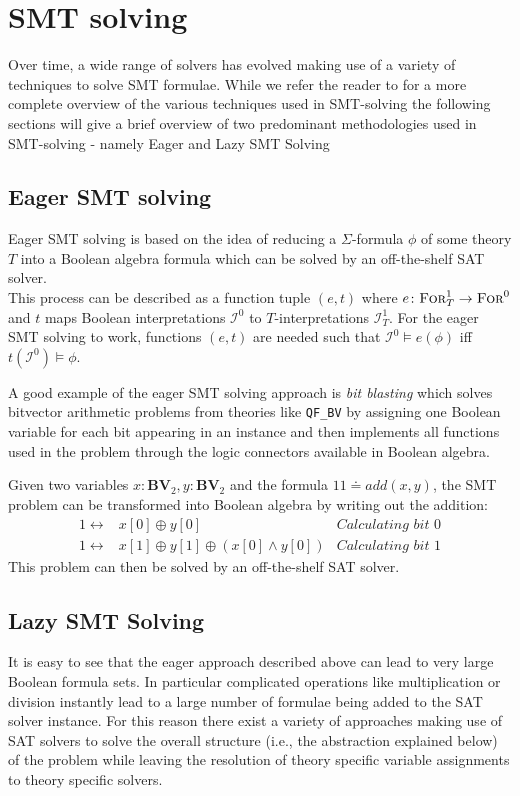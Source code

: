 \section{SMT solving}
Over time, a wide range of solvers has evolved making use of a variety of techniques to solve SMT formulae. While we refer the reader to \cite{Barrett-Tinelli-SMT} for a more complete overview of the various techniques used in SMT-solving the following sections will give a brief overview of two predominant methodologies used in SMT-solving - namely Eager and Lazy SMT Solving 
\subsection{Eager SMT solving}
Eager SMT solving is based on the idea of reducing a $\Sigma$-formula $\phi$ of some theory $T$ into a Boolean algebra formula which can be solved by an off-the-shelf SAT solver.\\
This process can be described as a function tuple $(e,t)$ where $e\colon\textsc{For}^1_T\to\textsc{For}^0$ and $t$ maps Boolean interpretations $\mathcal{I}^0$ to $T$-interpretations $\mathcal{I}^1_T$. For the eager SMT solving to work, functions $(e,t)$ are needed such that $\mathcal{I}^0\vDash e\left(\phi\right)$ iff $t\left(\mathcal{I}^0\right)\vDash\phi$.
\par
A good example of the eager SMT solving approach is \textit{bit blasting} which solves bitvector arithmetic problems from theories like \texttt{QF\_BV} by assigning one Boolean variable for each bit appearing in an instance and then implements all functions used in the problem through the logic connectors available in Boolean algebra.
\begin{example}[Addition]
Given two variables $x\colon\mathbf{BV}_2, y\colon\mathbf{BV}_2$ and the formula $11\doteq add\left(x,y\right)$,
the SMT problem can be transformed into Boolean algebra by writing out the addition:
\begin{align*}
1 \leftrightarrow & x[0] \oplus y[0] & \textit{Calculating bit 0}\\
1 \leftrightarrow & x[1] \oplus y[1] \oplus \left(x[0] \land y[0] \right) & \textit{Calculating bit 1}
\end{align*}
This problem can then be solved by an off-the-shelf SAT solver.
\end{example}

\subsection{Lazy SMT Solving}
It is easy to see that the eager approach described above can lead to very large Boolean formula sets. In particular complicated operations like multiplication or division instantly lead to a large number of formulae being added to the SAT solver instance. For this reason there exist a variety of approaches making use of SAT solvers to solve the overall structure (i.e., the abstraction explained below) of the problem while leaving the resolution of theory specific variable assignments to theory specific solvers.

